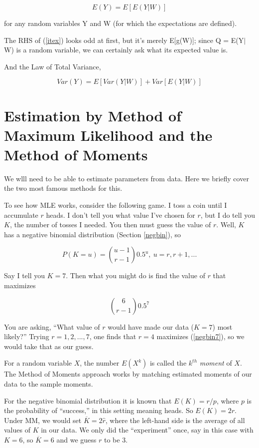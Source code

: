 \begin{equation}
\label{itex}
E(Y)=E[E(Y|W)]
\end{equation}

for any random variables Y and W (for which the expectations are
defined).  

The RHS of (\ref{itex}) looks odd at first, but it's merely E[g(W)];
since Q =  E(Y$|$W) is a random variable, we can certainly ask what its
expected value is.

And the Law of Total Variance,

\begin{equation}
\label{bis}
Var(Y)=E[Var(Y|W)]+Var[E(Y|W)]
\end{equation}

\section{Estimation by Method of Maximum Likelihood and the Method of
Moments}

We wlll need to be able to estimate parameters from data.  Here we
briefly cover the two most famous methods for this.

To see how MLE works, consider the following game.  I toss a coin until
I accumulate $r$ heads.  I don't tell you what value I've chosen for
$r$, but I do tell you $K$, the number of tosses I needed.  You then
must guess the value of $r$.  Well, $K$ has a negative binomial
distribution (Section \ref{negbin}), so

\begin{equation}
P(K = u) = \binom{u-1}{r-1} 0.5^u,~ u = r, r+1, ...
\end{equation} 

Say I tell you $K = 7$.  Then what you might do is find the value of $r$
that maximizes

\begin{equation}
\label{negbin7}
\binom{6}{r-1} 0.5^7
\end{equation}

You are asking, ``What value of $r$ would have made our data ($K = 7$)
most likely?''  Trying $r = 1,2,...,7$, one finds that $r = 4$ maximizes
(\ref{negbin7}), so we would take that as our guess.

For a random variable $X$, the number $E(X^k)$ is called the $k^{th}$
\textit{moment} of $X$.  The Method of Moments approach works by
matching estimated moments of our data to the sample moments.

For the negative binomial distribution it is known that $E(K) = r/p$,
where $p$ is the probability of ``success,'' in this setting meaning
heads.  So $E(K) = 2r$.  Under MM, we would set $\overline{K} = 2
\widehat{r}$, where the left-hand side is the average of all values of
$K$ in our data.  We only did the ``experiment'' once, say in this case
with $K = 6$, so $\overline{K} = 6$ and we guess $r$ to be 3.

